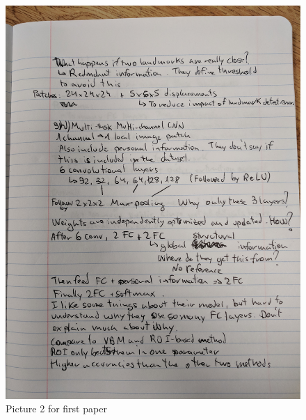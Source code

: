 \documentclass{article}
\begin{document}
\begin{figure}[h!]
\centering
\includegraphics[width=12cm]{paper1_2.jpg}
\caption{Picture 2 for first paper}
\label{fig:paper1_2}
\end{figure}
\end{document}
